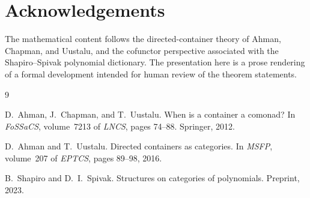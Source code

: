 \documentclass[11pt,a4paper]{article}
\theoremstyle{plain}
\theoremstyle{definition}
\begin{document}
\section*{Acknowledgements}

The mathematical content follows the directed-container theory of Ahman,
Chapman, and Uustalu, and the cofunctor perspective associated with the
Shapiro--Spivak polynomial dictionary. The presentation here is a prose
rendering of a formal development intended for human review of the theorem
statements.

\begin{thebibliography}{9}

D.~Ahman, J.~Chapman, and T.~Uustalu.
\newblock When is a container a comonad?
\newblock In \emph{FoSSaCS}, volume~7213 of \emph{LNCS}, pages 74--88.
\newblock Springer, 2012.

D.~Ahman and T.~Uustalu.
\newblock Directed containers as categories.
\newblock In \emph{MSFP}, volume~207 of \emph{EPTCS}, pages 89--98, 2016.

B.~Shapiro and D.~I.~Spivak.
\newblock Structures on categories of polynomials.
\newblock Preprint, 2023.

\end{thebibliography}
\end{document}
